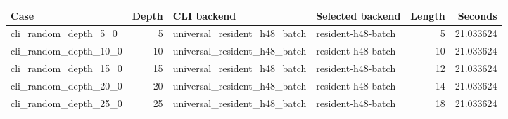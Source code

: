 {\small
\begin{tabular}{lrllrr}
\hline
Case & Depth & CLI backend & Selected backend & Length & Seconds \\
\hline
cli\_random\_depth\_5\_0 & 5 & universal\_resident\_h48\_batch & resident-h48-batch & 5 & 21.033624 \\
cli\_random\_depth\_10\_0 & 10 & universal\_resident\_h48\_batch & resident-h48-batch & 10 & 21.033624 \\
cli\_random\_depth\_15\_0 & 15 & universal\_resident\_h48\_batch & resident-h48-batch & 12 & 21.033624 \\
cli\_random\_depth\_20\_0 & 20 & universal\_resident\_h48\_batch & resident-h48-batch & 14 & 21.033624 \\
cli\_random\_depth\_25\_0 & 25 & universal\_resident\_h48\_batch & resident-h48-batch & 18 & 21.033624 \\
\hline
\end{tabular}
}
